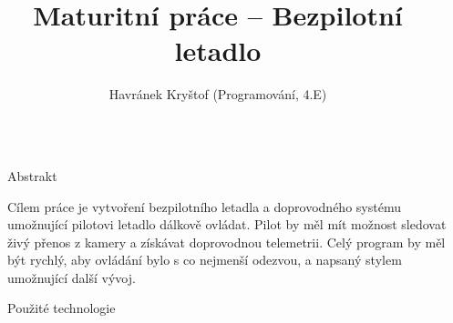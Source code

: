 \documentclass[final]{beamer}
\title{Maturitní práce -- Bezpilotní letadlo}
\author{Havránek Kryštof (Programování, 4.E)}
\institute[shortinst]{Gymnázium, Praha 6, Arabská 14}
\newlength{\sepwidth}
\newlength{\colwidth}
\newcommand{\separatorcolumn}{\begin{column}{\sepwidth}\end{column}}
\begin{document}
\begin{frame}[t]
  \begin{columns}[t]
    \separatorcolumn

    \begin{column}{\colwidth}

      \begin{block}{Abstrakt}

        Cílem práce je vytvoření bezpilotního letadla a doprovodného systému umožnující pilotovi letadlo dálkově ovládat.
        Pilot by měl mít možnost sledovat živý přenos z kamery a získávat doprovodnou telemetrii.
        Celý program by měl být rychlý, aby ovládání bylo s co nejmenší odezvou, a napsaný stylem umožnující další vývoj.

      \end{block}

      \begin{block}{Použité technologie}


\end{block}
\end{column}
\end{columns}
\end{frame}
\end{document}
